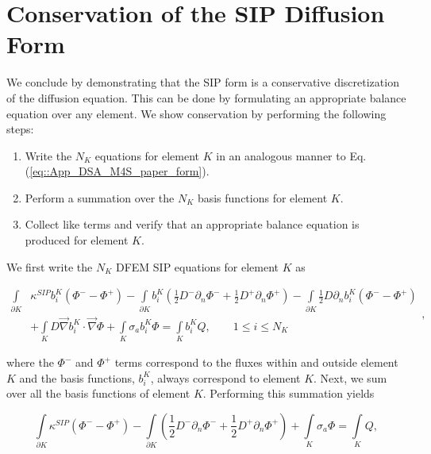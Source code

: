\newpage
\section{Conservation of the SIP Diffusion Form}
\label{sec::App_DSA_SIP_Conservation}

We conclude by demonstrating that the SIP form is a conservative discretization of the diffusion equation. This can be done by formulating an appropriate balance equation over any element. We show conservation by performing the following steps:


\begin{enumerate}
\item Write the $N_K$ equations for element $K$ in an analogous manner to Eq. (\ref{eq::App_DSA_M4S_paper_form}).
\item Perform a summation over the $N_K$ basis functions for element $K$.
\item Collect like terms and verify that an appropriate balance equation is produced for element $K$.
\end{enumerate}

We first write the $N_K$ DFEM SIP equations for element $K$ as

\begin{equation}
\label{eq::App_DSA_MIP_int_form}
\begin{aligned}
 \int\limits_{\partial K}& \kappa^{SIP}  b_i^K \left(  \Phi^- - \Phi^+ \right) -  \int\limits_{\partial K}   b_i^K \left( \frac{1}{2} D^- \partial_n  \Phi^- + \frac{1}{2} D^+ \partial_n \Phi^+ \right) -  \int\limits_{\partial K} \frac{1}{2} D \partial_n  b_i^K  \left(  \Phi^- - \Phi^+ \right)   \\
&+ \int\limits_{K} D \vec{\nabla} b_i^K \cdot \vec{\nabla}  \Phi + \int\limits_{K} \sigma_a  b_i^K  \Phi = \int\limits_{K}  b_i^K Q , \qquad 1 \leq i \leq N_K
\end{aligned},
\end{equation}

\noindent where the $\Phi^-$ and $\Phi^+$ terms correspond to the fluxes within and outside element $K$ and the basis functions, $b_i^K$, always correspond to element $K$. Next, we sum over all the basis functions of element $K$. Performing this summation yields


\begin{equation}
\label{eq::App_DSA_MIP_afterint}
 \int\limits_{\partial K} \kappa^{SIP}  \left(  \Phi^- - \Phi^+ \right) -  \int\limits_{\partial K}   \left( \frac{1}{2} D^- \partial_n  \Phi^- + \frac{1}{2} D^+ \partial_n \Phi^+ \right) + \int\limits_{K} \sigma_a   \Phi = \int\limits_{K}  Q ,
\end{equation}

